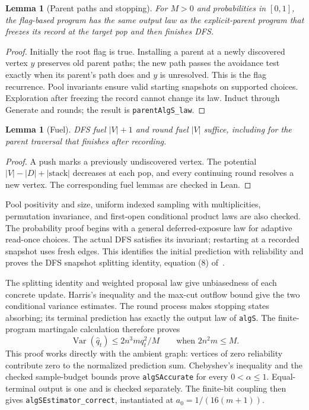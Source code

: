 \documentclass[11pt]{article}
\newtheorem{lemma}[theorem]{Lemma}
\begin{document}
\begin{lemma}[Parent paths and stopping]
For $M>0$ and probabilities in $[0,1]$, the flag-based program has the same
output law as the explicit-parent program that freezes its record at the
target pop and then finishes DFS.
\end{lemma}
\begin{proof}
Initially the root flag is true. Installing a parent at a newly discovered
vertex $y$ preserves old parent paths; the new path passes the avoidance test
exactly when its parent's path does and $y$ is unresolved. This is the flag
recurrence. Pool invariants ensure valid starting snapshots on supported
choices. Exploration after freezing the record cannot change its law.
Induct through Generate and rounds; the result is \texttt{parentAlgS\_law}.
\end{proof}

\begin{lemma}[Fuel]
DFS fuel $|V|+1$ and round fuel $|V|$ suffice, including for the
parent traversal that finishes after recording.
\end{lemma}
\begin{proof}
A push marks a previously undiscovered vertex. The potential
$|V|-|D|+|\mathrm{stack}|$ decreases at each pop, and every continuing round
resolves a new vertex. The corresponding fuel lemmas are checked in Lean.
\end{proof}

Pool positivity and size, uniform indexed sampling with multiplicities,
permutation invariance, and first-open conditional product laws are also
checked. The probability proof begins with a general deferred-exposure law
for adaptive read-once choices. The actual DFS satisfies its invariant;
restarting at a recorded snapshot uses fresh edges. This identifies the
initial prediction with reliability and proves the DFS snapshot splitting
identity, equation (8) of~\cite{ffg}.

The splitting identity and weighted proposal law give unbiasedness of each
concrete update. Harris's inequality and the max-cut outflow bound give the
two conditional variance estimates. The round process makes stopping states
absorbing; its terminal prediction has exactly the output law of
\texttt{algS}. The finite-program martingale calculation therefore proves
\[
  \operatorname{Var}(\widehat q_t)\leq 2n^3m q_t^2/M
  \qquad\text{when }2n^2m\leq M.
\]
This proof works directly with the ambient graph: vertices of zero
reliability contribute zero to the normalized prediction sum.
Chebyshev's inequality and the checked sample-budget bounds prove
\texttt{algSAccurate} for every $0<\alpha\leq1$. Equal-terminal output is
one and is checked separately. The finite-bit coupling then gives
\texttt{algSEstimator\_correct}, instantiated at $a_0=1/(16(m+1))$.
\end{document}
